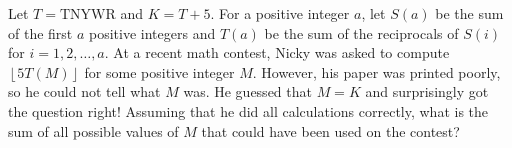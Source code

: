 Let $T=\text{TNYWR}$ and $K=T+5$. For a positive integer $a$, let $S\left(a\right)$ be the sum of the first $a$ positive integers and $T\left(a\right)$ be the sum of the reciprocals of $S\left(i\right)$ for $i=1,2,\ldots,a$. At a recent math contest, Nicky was asked to compute $\left\lfloor5T\left(M\right)\right\rfloor$ for some positive integer $M$. However, his paper was printed poorly, so he could not tell what $M$ was. He guessed that $M=K$ and surprisingly got the question right! Assuming that he did all calculations correctly, what is the sum of all possible values of $M$ that could have been used on the contest?